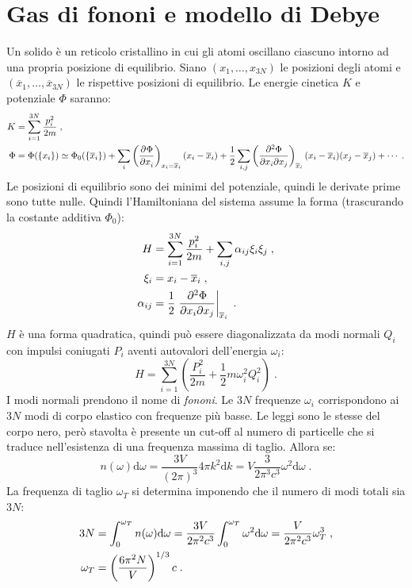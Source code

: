 \documentclass[10pt,a4paper]{report}
\theoremstyle{definition}
\newcommand{\pdev}[3][]{\frac{\partial^{#1} #2}{\partial #3^{#1}}}
\numberwithin{equation}{section}
\newcommand{\diff}[1][]{\mathrm{d}#1}
\begin{document}
\section{Gas di fononi e modello di Debye}
Un solido è un reticolo cristallino in cui gli atomi oscillano ciascuno intorno ad una propria posizione di equilibrio. Siano $(x_1,\ldots,x_{3N})$ le posizioni degli atomi e $(\overline{x}_1,\ldots,\overline{x}_{3N})$ le rispettive posizioni di equilibrio. Le energie cinetica $K$ e potenziale $\Phi$ saranno:
\begin{align}
K&= \sum_{i=1}^{3N}\frac{p_i^2}{2m} \notag\;, \\
\Phi &= \Phi(\{x_i\})\simeq \Phi_0(\{\overline{x}_i\})+\sum_i\left(\pdev{\Phi}{x_i}\right)_{x_i=\overline{x}_i}(x_i-\overline{x}_i)+\frac{1}{2}\sum_{i,j}\left(\frac{\partial^2\Phi}{\partial x_i\partial x_j}\right)_{\overline{x}_i}(x_i-\overline{x}_i)(x_j-\overline{x}_j)+\cdots\;.
\end{align}
Le posizioni di equilibrio sono dei minimi del potenziale, quindi le derivate prime sono tutte nulle. Quindi l'Hamiltoniana del sistema assume la forma (trascurando la costante additiva $\Phi_0$):
\begin{align}
H &= \sum_{i=1}^{3N}\frac{p_i^2}{2m}+\sum_{i,j}\alpha_{ij}\xi_i\xi_j\;, \notag \\
\xi_i &= x_i-\overline{x}_i\;, \notag \\
\alpha_{ij} &= \frac{1}{2}\left.\frac{\partial^2\Phi}{\partial x_i\partial x_j}\right|_{\overline{x}_i}\;.
\end{align}
$H$ è una forma quadratica, quindi può essere diagonalizzata da modi normali $Q_i$ con impulsi coniugati $P_i$ aventi autovalori dell'energia $\omega_i$:
\begin{equation}
H=\sum_{i=1}^{3N}\left(\frac{P_i^2}{2m}+\frac{1}{2}m\omega_i^2Q_i^2\right)\;.
\end{equation}
I modi normali prendono il nome di \emph{fononi}. Le $3N$ frequenze $\omega_i$ corrispondono ai $3N$ modi di corpo elastico con frequenze più basse. Le leggi sono le stesse del corpo nero, però stavolta è presente un cut-off al numero di particelle che si traduce nell'esistenza di una frequenza massima di taglio. Allora se:
$$
n(\omega)\diff{\omega}=\frac{3V}{(2\pi)^3}4\pi k^2\diff{k}=V\frac{3}{2\pi^3 c^3}\omega^2\diff{\omega}\;.
$$
La frequenza di taglio $\omega_T$ si determina imponendo che il numero di modi totali sia $3N$:
\begin{align}
3N &= \int_0^{\omega_T}n(\omega)\diff{\omega}=\frac{3V}{2\pi^2c^3}\int_0^{\omega_T}\omega^2\diff{\omega}=\frac{V}{2\pi^2c^3}\omega_T^3\;, \notag \\
\omega_T &=\left(\frac{6\pi^2 N}{V}\right)^{1/3}c\;.
\end{align}
\end{document}

